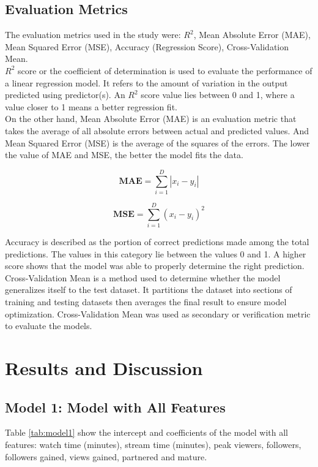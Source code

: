 \documentclass[runningheads]{llncs}
\begin{document}
\subsection{Evaluation Metrics}
The evaluation metrics used in the study were: $ R^2 $, Mean Absolute Error (MAE), Mean Squared Error (MSE), Accuracy (Regression Score), Cross-Validation Mean. \\

$ R^2 $ score or the coefficient of determination is used to evaluate the performance of a linear regression model. It refers to the amount of variation in the output predicted using predictor(s). An $ R^2 $ score value lies between 0 and 1, where a value closer to 1 means a better regression fit. \\

On the other hand, Mean Absolute Error (MAE) is an evaluation metric that takes the average of all absolute errors between actual and predicted values. And Mean Squared Error (MSE) is the average of the squares of the errors. The lower the value of MAE and MSE, the better the model fits the data.

\begin{equation}
    \textbf{MAE} = \sum_{i=1}^{D}|x_i-y_i|
\end{equation}

\begin{equation}
    \textbf{MSE} = \sum_{i=1}^{D}(x_i-y_i)^2
\end{equation}

Accuracy is described as the portion of correct predictions made among the total predictions. The values in this category lie between the values 0 and 1. A higher score shows that the model was able to properly determine the right prediction. \\

Cross-Validation Mean is a method used to determine whether the model generalizes itself to the test dataset. It partitions the dataset into sections of training and testing datasets then averages the final result to ensure model optimization. Cross-Validation Mean was used as secondary or verification metric to evaluate the models.


\section{Results and Discussion}

\subsection{Model 1: Model with All Features}
Table \ref{tab:model1} show the intercept and coefficients of the model with all features: watch time (minutes), stream time (minutes), peak viewers, followers, followers gained, views gained, partnered and mature. \\
\end{document}
